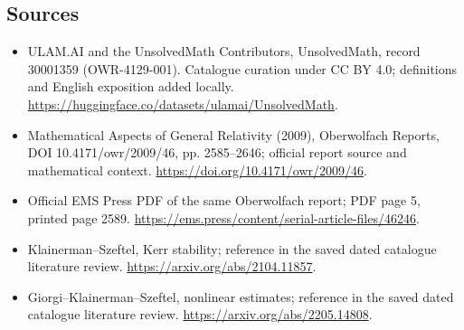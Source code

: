 \documentclass[11pt]{article}
\begin{document}
\subsection{Sources}
\begin{itemize}
\item[\hypertarget{source:30001359:1}{S1}] ULAM.AI and the UnsolvedMath Contributors, UnsolvedMath, record 30001359 (OWR-4129-001). Catalogue curation under CC BY 4.0; definitions and English exposition added locally.
\url{https://huggingface.co/datasets/ulamai/UnsolvedMath}.
\item[\hypertarget{source:30001359:2}{S2}] Mathematical Aspects of General Relativity (2009), Oberwolfach Reports, DOI 10.4171/owr/2009/46, pp. 2585--2646; official report source and mathematical context.
\url{https://doi.org/10.4171/owr/2009/46}.
\item[\hypertarget{source:30001359:3}{S3}] Official EMS Press PDF of the same Oberwolfach report; PDF page 5, printed page 2589.
\url{https://ems.press/content/serial-article-files/46246}.
\item[\hypertarget{source:30001359:4}{S4}] Klainerman--Szeftel, Kerr stability; reference in the saved dated catalogue literature review.
\url{https://arxiv.org/abs/2104.11857}.
\item[\hypertarget{source:30001359:5}{S5}] Giorgi--Klainerman--Szeftel, nonlinear estimates; reference in the saved dated catalogue literature review.
\url{https://arxiv.org/abs/2205.14808}.
\end{itemize}
\label{end:30001359}
\end{document}
